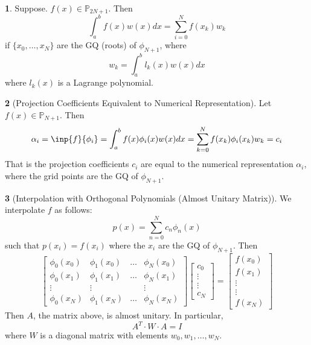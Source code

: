 \documentclass[12pt]{article}
\theoremstyle{definition}
\newtheorem{theorem}{\color{ForestGreen}{\textbf{Theorem}}}
\begin{document}
\begin{theorem}
Suppose. $f(x) \in \mathbb{P}_{2N+1}$. Then
\begin{equation}
\int_{a}^b f(x)w(x)dx = \sum_{i=0}^N f(x_k) w_k
\end{equation}
if $\{x_0, \ldots, x_N\}$ are the GQ (roots) of $\phi_{N+1}$, where
\begin{equation}
w_k = \int_a^b l_k(x)w(x)dx
\end{equation}
where $l_k(x)$ is a Lagrange polynomial.
\end{theorem}

\begin{theorem}[Projection Coefficients Equivalent to Numerical Representation]
Let $f(x) \in \mathbb{P}_{N+1}$. Then
\begin{equation}
\alpha_i = \inp{f}{\phi_i} = \int_a^b f(x)\phi_i(x)w(x)dx = \sum_{k=0}^N f(x_k)\phi_i(x_k)w_k = c_i
\end{equation}
That is the projection coefficients $c_i$ are equal to the numerical representation $\alpha_i$, where the grid points are the GQ of $\phi_{N+1}$.
\end{theorem}

\begin{theorem}[Interpolation with Orthogonal Polynomials (Almost Unitary Matrix)]
We interpolate $f$ as follows:
\begin{equation}
p(x) = \sum_{n=0}^N c_n \phi_n(x)
\end{equation}
such that $p(x_i) = f(x_i)$ where the $x_i$ are the GQ of $\phi_{N+1}$. Then
\begin{equation}
\begin{bmatrix}
\phi_0(x_0) & \phi_1(x_0) & \hdots & \phi_N(x_0) \\
\phi_0(x_1) & \phi_1(x_1) & \hdots & \phi_N(x_1) \\
\vdots & \vdots & & \vdots  \\
\phi_0(x_N) & \phi_1(x_N) & \hdots & \phi_N(x_N)
\end{bmatrix}
\begin{bmatrix}
c_0 \\ \vdots \\ \vdots \\ c_N
\end{bmatrix}
=
\begin{bmatrix}
f(x_0) \\ f(x_1) \\ \vdots \\ \vdots  \\ f(x_N)
\end{bmatrix}
\end{equation}
Then $A$, the matrix above, is almost unitary. In particular,
\begin{equation}
A^T \cdot W \cdot A = I
\end{equation}
where $W$ is a diagonal matrix with elements $w_0, w_1, \ldots, w_N$.
\end{theorem}
\end{document}

